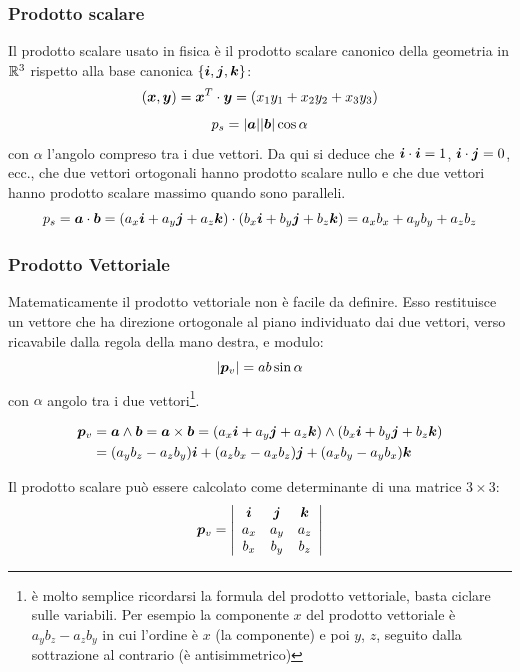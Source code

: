 \subsubsection{Prodotto scalare}
Il prodotto scalare usato in fisica è il prodotto scalare canonico della geometria in $\mathbb{R}^3$ rispetto alla base canonica $\{\boldsymbol{i},\boldsymbol{j},\boldsymbol{k}\}$:
\begin{equation*}\left(\boldsymbol{x},\boldsymbol{y}\right)=\boldsymbol{x}^T\cdot\boldsymbol{y}=(x_1y_1+x_2y_2+x_3y_3)\end{equation*}
\begin{equation*}p_s=|\boldsymbol{a}||\boldsymbol{b}| \cos \alpha\end{equation*}
 con $\alpha$ l'angolo compreso tra i due vettori. Da qui si deduce che $\boldsymbol{i} \cdot \boldsymbol{i}=1$, $\boldsymbol{i}
\cdot \boldsymbol{j}=0$, ecc., che due vettori ortogonali hanno prodotto scalare nullo e che due vettori hanno prodotto scalare massimo quando sono paralleli.
\[p_s=\boldsymbol{a} \cdot \boldsymbol{b}=(a_x\boldsymbol{i}+a_y\boldsymbol{j}+a_z\boldsymbol{k})\cdot(b_x\boldsymbol{i}+b_y\boldsymbol{j}+b_z\boldsymbol{k})=a_xb_x+a_yb_y+a_zb_z\]
\subsubsection{Prodotto Vettoriale}
Matematicamente il prodotto vettoriale non è facile da definire. Esso restituisce un vettore che ha direzione ortogonale al piano individuato dai due vettori, verso ricavabile dalla regola della mano destra, e modulo:
\begin{equation*}|\boldsymbol{p}_v|=ab\sin \alpha\end{equation*} con $\alpha$ angolo tra i due vettori\footnote{è molto semplice ricordarsi la formula del prodotto vettoriale, basta ciclare sulle variabili. Per esempio la componente $x$ del prodotto vettoriale è $a_yb_z-a_zb_y$ in cui l'ordine è $x$ (la componente) e poi $y$, $z$, seguito dalla sottrazione al contrario (è antisimmetrico)}.


\begin{align*}
\boldsymbol{p}_v&=\boldsymbol{a} \wedge \boldsymbol{b}=\boldsymbol{a} \times \boldsymbol{b}=(a_x\boldsymbol{i}+a_y\boldsymbol{j}+a_z\boldsymbol{k})\wedge(b_x\boldsymbol{i}+b_y\boldsymbol{j}+b_z\boldsymbol{k})\\
&=(a_yb_z-a_zb_y)\boldsymbol{i}+(a_zb_x-a_xb_z)\boldsymbol{j}+(a_xb_y-a_yb_x)\boldsymbol{k}
\end{align*}

Il prodotto scalare può essere calcolato come determinante di una matrice $3\times 3$:
\[\boldsymbol{p}_v=
\left| \begin{array}{ccc} \boldsymbol{i} & \boldsymbol{j} & \boldsymbol{k}\\
a_x & a_y & a_z\\
b_x & b_y& b_z
 \end{array} \right|\]

